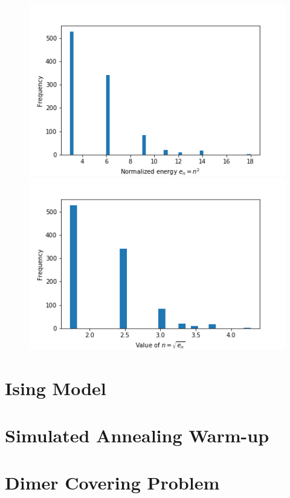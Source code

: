 \documentclass{article}
\begin{document}
\begin{figure}[H]
	\centering
	\begin{minipage}{0.49\linewidth}
		\includegraphics[width=\linewidth]{../images/q1a_energy_hist.png}
	\end{minipage}
		\begin{minipage}{0.49\linewidth}
		\includegraphics[width=\linewidth]{../images/q1a_n_hist.png}
	\end{minipage}
\end{figure}

\section{Ising Model}

\section{Simulated Annealing Warm-up}

\section{Dimer Covering Problem}
\end{document}
